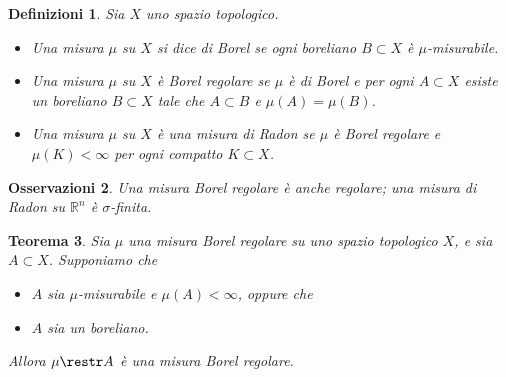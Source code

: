 \documentclass[a4paper,10pt,openright,oneside]{book}
\theoremstyle{theoremstyle}
\newtheorem{teorema}{Teorema}[section]
\theoremstyle{theoremstylewoheader}
\theoremstyle{theoremstyle}
\newtheorem{definizioni}[teorema]{Definizioni}
\newtheorem{osservazioni}[teorema]{Osservazioni}
\theoremstyle{proofsecstyle}
\theoremstyle{nonumberplain}
\newcommand{\RR}{\ensuremath{\mathbb{R}}}
\begin{document}
\begin{definizioni}
\label{def:misure_di_borel_e_di_radon}
Sia $X$ uno spazio topologico.
\begin{itemize}
\item[(i)] Una misura $\mu$ su $X$ si dice \emph{di Borel} se ogni boreliano $B \subset X$ è $\mu$-misurabile.
\item[(ii)] Una misura $\mu$ su $X$ è \emph{Borel regolare} se $\mu$ è di Borel e per ogni $A \subset X$ esiste un boreliano $B \subset X$ tale che $A \subset B$ e $\mu(A) = \mu(B)$.
\item[(iii)] Una misura $\mu$ su $X$ è una \emph{misura di Radon} se $\mu$ è Borel regolare e $\mu(K) < \infty$ per ogni compatto $K \subset X$.
\end{itemize}
\end{definizioni}

\begin{osservazioni}
Una misura Borel regolare è anche regolare; una misura di Radon su $\RR^n$ è $\sigma$-finita.
\end{osservazioni}

\begin{teorema}
\label{thm:restrizione_misura_borel_regolare}
Sia $\mu$ una misura Borel regolare su uno spazio topologico $X$, e sia $A \subset X$. Supponiamo che
\begin{itemize}
\item[(i)] $A$ sia $\mu$-misurabile e $\mu(A) < \infty$, oppure che
\item[(ii)] $A$ sia un boreliano.
\end{itemize}
Allora $\mu \restr A$ è una misura Borel regolare.
\end{teorema}
\end{document}
